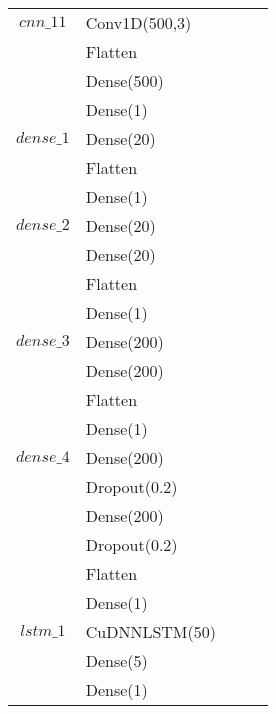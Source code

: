 \begin{longtable}{| c | m{0.58\linewidth} | r | m{0.1\linewidth} |}
    $cnn\_11$   & Conv1D(500,3)                 \\
                & Flatten                       \\
                & Dense(500)                    \\
                & Dense(1)                      \\ \hline


    $dense\_1$  & Dense(20)                     \\
                & Flatten                       \\
                & Dense(1)                      \\ \hline



    $dense\_2$  & Dense(20)                     \\
                & Dense(20)                     \\
                & Flatten                       \\
                & Dense(1)                      \\ \hline

    $dense\_3$  & Dense(200)                    \\
                & Dense(200)                    \\
                & Flatten                       \\
                & Dense(1)                      \\ \hline

    $dense\_4$  & Dense(200)                    \\
                & Dropout(0.2)                  \\
                & Dense(200)                    \\
                & Dropout(0.2)                  \\
                & Flatten                       \\
                & Dense(1)                      \\ \hline
    $lstm\_1$   & CuDNNLSTM(50)                 \\
                & Dense(5)                      \\
                & Dense(1)                      \\ \hline


\end{longtable}
